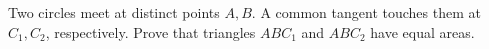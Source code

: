 Two circles meet at distinct points $A,B$. A common tangent touches them at $C_1,C_2$, respectively. Prove that triangles $ABC_1$ and $ABC_2$ have equal areas.
